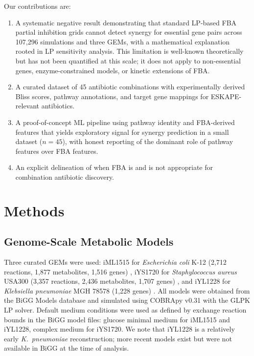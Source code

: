 \documentclass[12pt,a4paper]{article}
\begin{document}
Our contributions are:
\begin{enumerate}
    \item A systematic negative result demonstrating that standard LP-based FBA partial inhibition grids cannot detect synergy for essential gene pairs across 107,296 simulations and three GEMs, with a mathematical explanation rooted in LP sensitivity analysis. This limitation is well-known theoretically \citep{bertsimas1997} but has not been quantified at this scale; it does not apply to non-essential genes, enzyme-constrained models, or kinetic extensions of FBA.
    \item A curated dataset of 45 antibiotic combinations with experimentally derived Bliss scores, pathway annotations, and target gene mappings for ESKAPE-relevant antibiotics.
    \item A proof-of-concept ML pipeline using pathway identity and FBA-derived features that yields exploratory signal for synergy prediction in a small dataset ($n = 45$), with honest reporting of the dominant role of pathway features over FBA features.
    \item An explicit delineation of when FBA is and is not appropriate for combination antibiotic discovery.
\end{enumerate}

\section{Methods}

\subsection{Genome-Scale Metabolic Models}

Three curated GEMs were used: iML1515 for \textit{Escherichia coli} K-12 (2,712 reactions, 1,877 metabolites, 1,516 genes) \citep{monk2017}, iYS1720 for \textit{Staphylococcus aureus} USA300 (3,357 reactions, 2,436 metabolites, 1,707 genes) \citep{seif2018}, and iYL1228 for \textit{Klebsiella pneumoniae} MGH 78578 (1,228 genes) \citep{liao2011}. All models were obtained from the BiGG Models database \citep{king2016} and simulated using COBRApy v0.31 \citep{ebrahim2013} with the GLPK LP solver. Default medium conditions were used as defined by exchange reaction bounds in the BiGG model files: glucose minimal medium for iML1515 and iYL1228, complex medium for iYS1720. We note that iYL1228 is a relatively early \textit{K.\ pneumoniae} reconstruction; more recent models exist but were not available in BiGG at the time of analysis.
\end{document}
